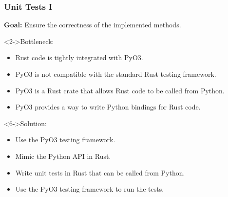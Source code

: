 \documentclass[t,english]{beamer}
\begin{document}
\begin{frame}
  \frametitle{Unit Tests I}
  \textbf{Goal:} Ensure the correctness of the implemented methods.

  \begin{block}<2->{Bottleneck:}
    \begin{itemize}
      \item <2-> Rust code is tightly integrated with PyO3.
      \item <3-> PyO3 is not compatible with the standard Rust testing framework.
      \item <4-> PyO3 is a Rust crate that allows Rust code to be called from Python.
      \item <5-> PyO3 provides a way to write Python bindings for Rust code.
    \end{itemize}
  \end{block}

  \begin{block}<6->{Solution:}
    \begin{itemize}
      \item <6-> Use the PyO3 testing framework.
      \item <7-> Mimic the Python API in Rust.
      \item <8-> Write unit tests in Rust that can be called from Python.
      \item <9-> Use the PyO3 testing framework to run the tests.
    \end{itemize}
  \end{block}

\end{frame}
\end{document}
